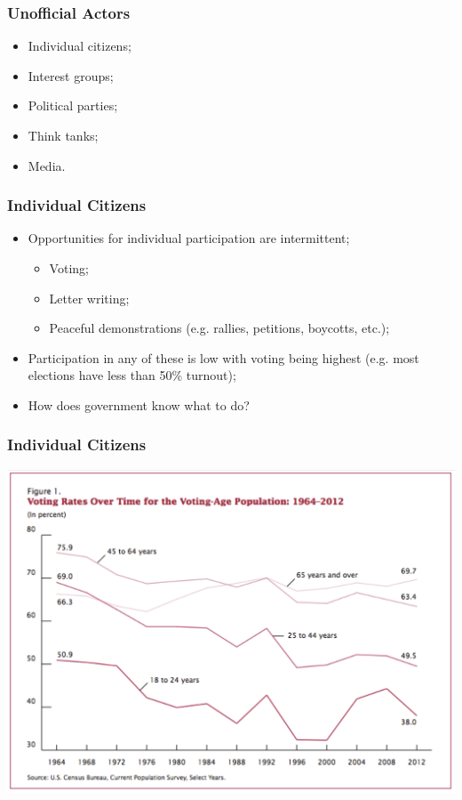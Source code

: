\documentclass[aspectratio=169]{beamer}
\theoremstyle{principle}
\begin{document}
\begin{frame}
\frametitle{Unofficial Actors}
\begin{itemize}
\item Individual citizens;
\bigskip
\bigskip
\item Interest groups;
\bigskip
\bigskip
\item Political parties;
\bigskip
\bigskip
\item Think tanks;
\bigskip
\bigskip
\item Media.
\end{itemize}
\end{frame}

\begin{frame}
\frametitle{Individual Citizens}
\begin{itemize}
\item Opportunities for individual participation are intermittent;
\begin{itemize}
\item Voting;
\item Letter writing;
\item Peaceful demonstrations (e.g. rallies, petitions, boycotts, etc.);
\end{itemize}
\bigskip
\item Participation in any of these is low with voting being highest (e.g. most elections have less than 50\% turnout);
\bigskip
\item How does government know what to do?
\end{itemize}
\end{frame}

\begin{frame}
\frametitle{Individual Citizens}
    \begin{center}
     \includegraphics[scale=0.38]{Voting.png}
     \end{center}
\end{frame}
\end{document}
